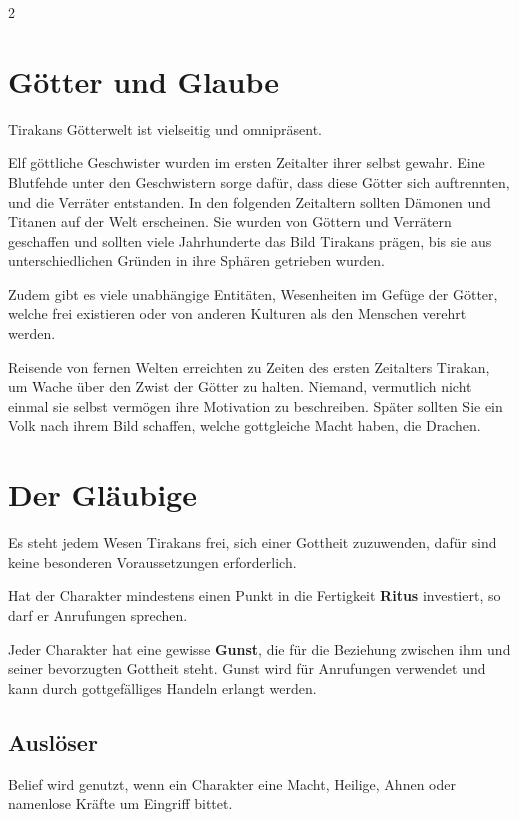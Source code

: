 \label{ch:belief}

\begin{multicols*}{2}

\section{Götter und Glaube}\label{sec:gotter-und-glaube}

Tirakans Götterwelt ist vielseitig und omnipräsent.

Elf göttliche Geschwister wurden im ersten Zeitalter ihrer selbst gewahr.
Eine Blutfehde unter den Geschwistern sorge dafür, dass diese Götter sich auftrennten, und die Verräter entstanden.
In den folgenden Zeitaltern sollten Dämonen und Titanen auf der Welt erscheinen.
Sie wurden von Göttern und Verrätern geschaffen und sollten viele Jahrhunderte das Bild Tirakans prägen, bis sie aus unterschiedlichen Gründen in ihre Sphären getrieben wurden.

Zudem gibt es viele unabhängige Entitäten, Wesenheiten im Gefüge der Götter, welche frei existieren oder von anderen Kulturen als den Menschen verehrt werden.

Reisende von fernen Welten erreichten zu Zeiten des ersten Zeitalters Tirakan, um Wache über den Zwist der Götter zu halten.
Niemand, vermutlich nicht einmal sie selbst vermögen ihre Motivation zu beschreiben.
Später sollten Sie ein Volk nach ihrem Bild schaffen, welche gottgleiche Macht haben, die Drachen.

\section{Der Gläubige}\label{sec:der-glaubige}

Es steht jedem Wesen Tirakans frei, sich einer Gottheit zuzuwenden, dafür sind keine besonderen Voraussetzungen erforderlich.

Hat der Charakter mindestens einen Punkt in die Fertigkeit \textbf{Ritus} investiert, so darf er Anrufungen sprechen.

Jeder Charakter hat eine gewisse \textbf{Gunst}, die für die Beziehung zwischen ihm und seiner bevorzugten Gottheit steht.
Gunst wird für Anrufungen verwendet und kann durch gottgefälliges Handeln erlangt werden.

\subsection{Auslöser}
Belief wird genutzt, wenn ein Charakter eine Macht, Heilige, Ahnen oder namenlose Kräfte um Eingriff bittet.


\end{multicols*}
